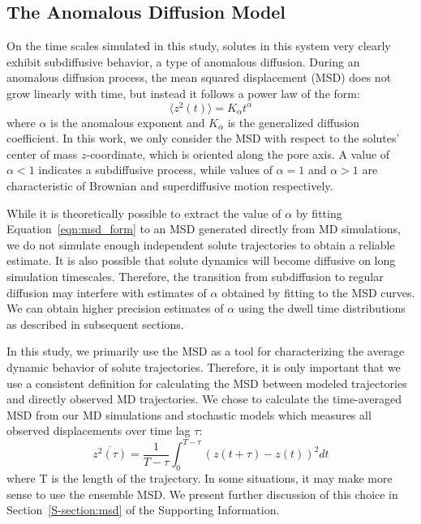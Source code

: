 \documentclass[journal=ancac3,manuscript=article,layout=twocolumn]{achemso}
\begin{document}
  \subsection{The Anomalous Diffusion Model}\label{method:model_sFBM}

  On the time scales simulated in this study, solutes in this system very 
  clearly exhibit subdiffusive behavior, a type of anomalous diffusion. 
  During an anomalous diffusion process, the mean squared displacement (MSD)
  does not grow linearly with time, but instead it follows a power law of 
  the form: 
  \begin{equation} 
  \langle z^2(t) \rangle = K_{\alpha}t^{\alpha}
  \label{eqn:msd_form}
  \end{equation} 
  where $\alpha$ is the anomalous exponent and $K_{\alpha}$ is the generalized 
  diffusion coefficient. In this work, we only consider the MSD with respect to
  the solutes' center of mass $z$-coordinate, which is oriented along the pore 
  axis. A value of $\alpha < 1$ indicates a subdiffusive process, while values
  of $\alpha = 1$ and $\alpha > 1$ are characteristic of Brownian and 
  superdiffusive motion respectively.
 
  While it is theoretically possible to extract the value of $\alpha$ by fitting
  Equation~\ref{eqn:msd_form} to an MSD generated directly from MD simulations, 
  we do not simulate enough independent solute trajectories to obtain a reliable
  estimate. It is also possible that solute dynamics will become diffusive on
  long simulation timescales. Therefore, the transition from subdiffusion to regular
  diffusion may interfere with estimates of $\alpha$ obtained by fitting to the MSD
  curves. We can obtain higher precision estimates of $\alpha$ using the dwell
  time distributions as described in subsequent sections.
  
  In this study, we primarily use the MSD as a tool for characterizing the average
  dynamic behavior of solute trajectories. Therefore, it is only important that we use a
  consistent definition for calculating the MSD between modeled trajectories and
  directly observed MD trajectories. We chose to calculate the time-averaged MSD from 
  our MD simulations and stochastic models which measures all observed displacements
  over time lag $\tau$: 
  \begin{equation}
  \overline{z^2(\tau)} = \dfrac{1}{T - \tau}\int_{0}^{T - \tau} (z(t + \tau) - z(t))^2 dt
  \label{eqn:tamsd}
  \end{equation}
  where T is the length of the trajectory. In some situations, it may make
  more sense to use the ensemble MSD. We present further discussion of this
  choice in Section~\ref{S-section:msd} of the Supporting Information.
\end{document}
